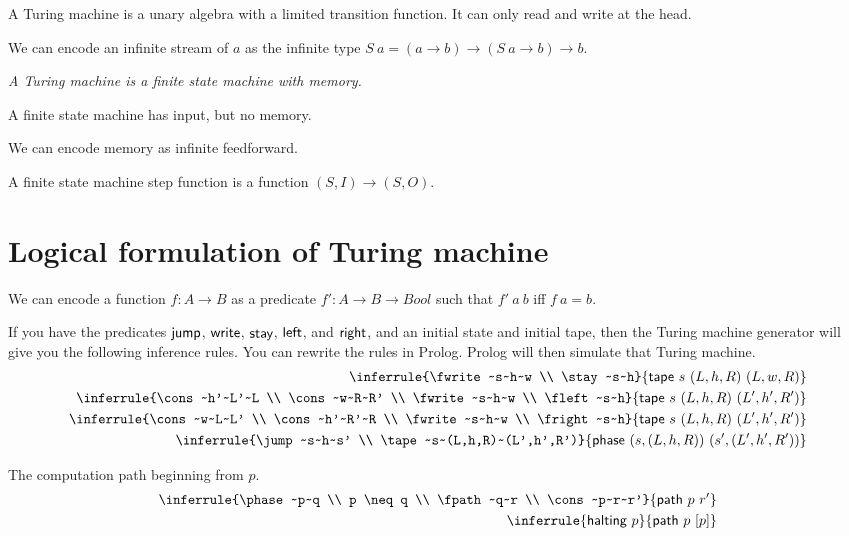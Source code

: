 A Turing machine is a unary algebra with a limited transition function.
It can only read and write at the head.

We can encode an infinite stream of \(a\)
as the infinite type \(S~a = (a \to b) \to (S~a \to b) \to b\).

\emph{A Turing machine is a finite state machine with memory.}

A finite state machine has input, but no memory.

We can encode memory as infinite feedforward.

A finite state machine step function is a function \((S,I) \to (S,O)\).

\section{Logical formulation of Turing machine}

We can encode a function \(f : A \to B\) as a predicate \(f' : A \to B \to Bool\) such that \(f'~a~b\) iff \(f~a = b\).

If you have the predicates \(\textsf{jump}\), \(\textsf{write}\), \(\textsf{stay}\), \(\textsf{left}\), and \(\textsf{right}\),
and an initial state and initial tape,
then the Turing machine generator will give you the following inference rules.
You can rewrite the rules in Prolog.
Prolog will then simulate that Turing machine.
\begin{align}
    \inferrule
    {\fwrite~s~h~w \\ \stay~s~h}
    {\tape~s~(L,h,R)~(L,w,R)}
    \\
    \inferrule
    {\cons~h'~L'~L \\ \cons~w~R~R' \\ \fwrite~s~h~w \\ \fleft~s~h}
    {\tape~s~(L,h,R)~(L',h',R')}
    \\
    \inferrule
    {\cons~w~L~L' \\ \cons~h'~R'~R \\ \fwrite~s~h~w \\ \fright~s~h}
    {\tape~s~(L,h,R)~(L',h',R')}
    \\
    \inferrule
    {\jump~s~h~s' \\ \tape~s~(L,h,R)~(L',h',R')}
    {\phase~(s,(L,h,R))~(s',(L',h',R'))}
\end{align}

The computation path beginning from \(p\).
\begin{align}
    \inferrule
    {\phase~p~q \\ p \neq q \\ \fpath~q~r \\ \cons~p~r~r'}
    {\fpath~p~r'}
    \\
    \inferrule
    {\halting~p}
    {\fpath~p~[p]}
\end{align}

